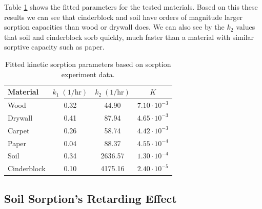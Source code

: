Table \ref{tbl:sorption_fit} shows the fitted parameters for the tested materials.
Based on this these results we can see that cinderblock and soil have orders of magnitude larger sorption capacities than wood or drywall does.
We can also see by the $k_2$ values that soil and cinderblock sorb quickly, much faster than a material with similar sorptive capacity such as paper.

\begin{table}[htb!]
  \caption{Fitted kinetic sorption parameters based on sorption experiment data.}
  \label{tbl:sorption_fit}
  \centering
  \begin{tabular}{l c c c}
    \toprule
    Material & $k_1 \; \mathrm{(1/hr)}$ & $k_2 \; \mathrm{(1/hr)}$ & $K$ \\
    \hline
    Wood & 0.32 & 44.90 & $7.10 \cdot 10^{-3}$ \\
    Drywall & 0.41 & 87.94 & $4.65 \cdot 10^{-3}$ \\
    Carpet & 0.26 & 58.74 & $4.42 \cdot 10^{-3}$ \\
    Paper & 0.04 & 88.37 & $4.55 \cdot 10^{-4}$ \\
    Soil & 0.34 & 2636.57 & $1.30 \cdot 10^{-4}$ \\
    Cinderblock & 0.10 & 4175.16 & $2.40 \cdot 10^{-5}$ \\
    \bottomrule
  \end{tabular}
\end{table}



\subsection{Soil Sorption's Retarding Effect}\label{sec:retardation_effect}


